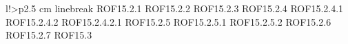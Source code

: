 \begin{tabella}{l!{\VRule}>{\centering\arraybackslash}p{2.5 cm}}
linebreak ROF15.2.1 \linebreak ROF15.2.2 \linebreak ROF15.2.3 \linebreak ROF15.2.4 \linebreak ROF15.2.4.1 \linebreak ROF15.2.4.2 \linebreak ROF15.2.4.2.1 \linebreak ROF15.2.5 \linebreak ROF15.2.5.1 \linebreak ROF15.2.5.2 \linebreak ROF15.2.6 \linebreak ROF15.2.7 \linebreak ROF15.3 \linebrea
\end{tabella}
